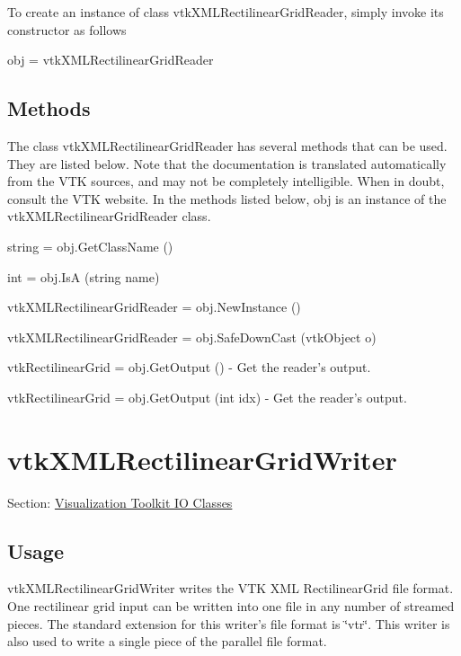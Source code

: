 To create an instance of class vtk\-X\-M\-L\-Rectilinear\-Grid\-Reader, simply invoke its constructor as follows \begin{DoxyVerb}  obj = vtkXMLRectilinearGridReader
\end{DoxyVerb}
 \hypertarget{vtkwidgets_vtkxyplotwidget_Methods}{}\subsection{Methods}\label{vtkwidgets_vtkxyplotwidget_Methods}
The class vtk\-X\-M\-L\-Rectilinear\-Grid\-Reader has several methods that can be used. They are listed below. Note that the documentation is translated automatically from the V\-T\-K sources, and may not be completely intelligible. When in doubt, consult the V\-T\-K website. In the methods listed below, {\ttfamily obj} is an instance of the vtk\-X\-M\-L\-Rectilinear\-Grid\-Reader class. 
\begin{DoxyItemize}
\item {\ttfamily string = obj.\-Get\-Class\-Name ()}  
\item {\ttfamily int = obj.\-Is\-A (string name)}  
\item {\ttfamily vtk\-X\-M\-L\-Rectilinear\-Grid\-Reader = obj.\-New\-Instance ()}  
\item {\ttfamily vtk\-X\-M\-L\-Rectilinear\-Grid\-Reader = obj.\-Safe\-Down\-Cast (vtk\-Object o)}  
\item {\ttfamily vtk\-Rectilinear\-Grid = obj.\-Get\-Output ()} -\/ Get the reader's output.  
\item {\ttfamily vtk\-Rectilinear\-Grid = obj.\-Get\-Output (int idx)} -\/ Get the reader's output.  
\end{DoxyItemize}\hypertarget{vtkio_vtkxmlrectilineargridwriter}{}\section{vtk\-X\-M\-L\-Rectilinear\-Grid\-Writer}\label{vtkio_vtkxmlrectilineargridwriter}
Section\-: \hyperlink{sec_vtkio}{Visualization Toolkit I\-O Classes} \hypertarget{vtkwidgets_vtkxyplotwidget_Usage}{}\subsection{Usage}\label{vtkwidgets_vtkxyplotwidget_Usage}
vtk\-X\-M\-L\-Rectilinear\-Grid\-Writer writes the V\-T\-K X\-M\-L Rectilinear\-Grid file format. One rectilinear grid input can be written into one file in any number of streamed pieces. The standard extension for this writer's file format is \char`\"{}vtr\char`\"{}. This writer is also used to write a single piece of the parallel file format.

